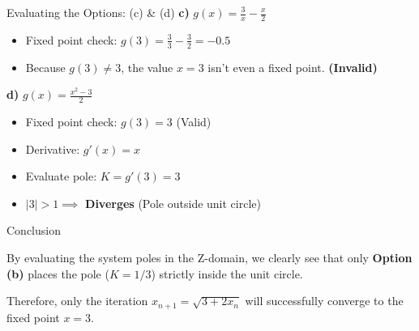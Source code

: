 \documentclass{beamer}
\begin{document}
\begin{frame}{Evaluating the Options: (c) \& (d)}
    \textbf{c)} $g(x) = \frac{3}{x} - \frac{x}{2}$
    \begin{itemize}
        \item Fixed point check: $g(3) = \frac{3}{3} - \frac{3}{2} = -0.5$
        \item Because $g(3) \neq 3$, the value $x=3$ isn't even a fixed point. \textbf{(Invalid)}
    \end{itemize}
    
    \vspace{0.3cm}
    \textbf{d)} $g(x) = \frac{x^2 - 3}{2}$
    \begin{itemize}
        \item Fixed point check: $g(3) = 3$ (Valid)
        \item Derivative: $g'(x) = x$
        \item Evaluate pole: $K = g'(3) = 3$
        \item $|3| > 1 \implies$ \textbf{Diverges} (Pole outside unit circle)
    \end{itemize}
\end{frame}

\begin{frame}{Conclusion}
    \begin{center}
        \Large By evaluating the system poles in the Z-domain, we clearly see that only \textbf{Option (b)} places the pole ($K = 1/3$) strictly inside the unit circle. 
        
        \vspace{0.5cm}
        Therefore, only the iteration $x_{n+1} = \sqrt{3 + 2x_n}$ will successfully converge to the fixed point $x=3$.
    \end{center}
\end{frame}
\end{document}
